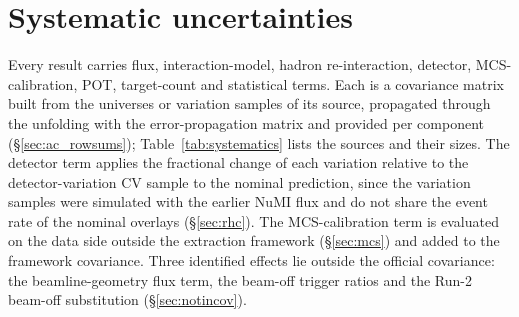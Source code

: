 \documentclass[11pt,a4paper]{article}
\begin{document}
\section{Systematic uncertainties}
\label{sec:systematics}

Every result carries flux, interaction-model, hadron re-interaction, detector, MCS-calibration,
POT, target-count and statistical terms. Each is a covariance matrix built from the universes or
variation samples of its source, propagated through the unfolding with the error-propagation matrix
and provided per component (\S\ref{sec:ac_rowsums}); Table~\ref{tab:systematics} lists the sources
and their sizes. The detector term applies the fractional change of each variation relative to the
detector-variation CV sample to the nominal prediction, since the variation samples were simulated with
the earlier NuMI flux and do not share the event rate of the nominal overlays (\S\ref{sec:rhc}). The MCS-calibration term is evaluated on the data side outside the extraction
framework (\S\ref{sec:mcs}) and added to the framework covariance. Three identified effects lie outside the official covariance: the
beamline-geometry flux term, the beam-off trigger ratios and the Run-2 beam-off substitution
(\S\ref{sec:notincov}).
\end{document}
